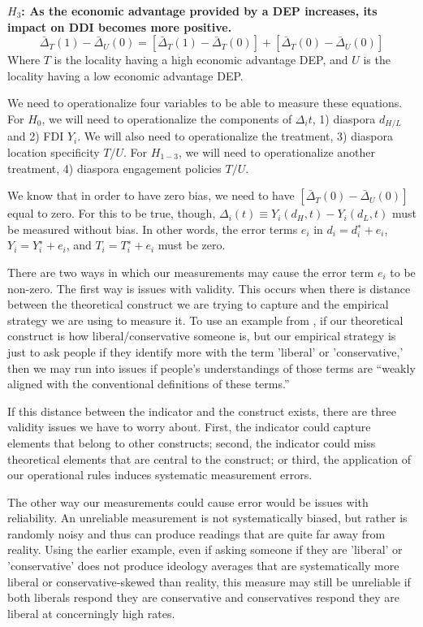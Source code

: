 \documentclass[12pt]{article}
\begin{document}
\textbf{$H_3$:  As the economic advantage provided by a DEP increases, its impact on DDI becomes more positive.}
\[
\bar{\Delta}_T(1)-\bar{\Delta}_U(0)
=
\left[\bar{\Delta}_T(1)-\bar{\Delta}_T(0)\right]
+
\left[\bar{\Delta}_T(0)-\bar{\Delta}_U(0)\right]
\]
Where $T$ is the locality having a high economic advantage DEP, and $U$ is the locality having a low economic advantage DEP.

    We need to operationalize four variables to be able to measure these equations. For $H_0$, we will need to operationalize the components of $\Delta_it$, 1) diaspora $d_{H/L}$ and 2) FDI $Y_i$. We will also need to operationalize the treatment, 3) diaspora location specificity $T/U$. For $H_{1-3}$, we will need to operationalize another treatment, 4) diaspora engagement policies $T/U$.  

     We know that in order to have zero bias, we need to have $\left[\bar{\Delta}_T(0)-\bar{\Delta}_U(0)\right]$ equal to zero. For this to be true, though, $
\Delta_i(t) \equiv Y_i(d_H,t)-Y_i(d_L,t)$ must be measured without bias. In other words, the error terms $e_i$ in $d_i=d_i^∗+e_i$, $Y_i=Y_i^∗+e_i$, and $T_i=T_i^∗+e_i$ must be zero. 

    There are two ways in which our measurements may cause the error term $e_i$ to be non-zero. The first way is issues with validity. This occurs when there is distance between the theoretical construct we are trying to capture and the empirical strategy we are using to measure it. To use an example from \citet{yeung_self-reported_2025}, if our theoretical construct is how liberal/conservative someone is, but our empirical strategy is just to ask people if they identify more with the term 'liberal' or 'conservative,' then we may run into issues if people's understandings of those terms are ``weakly aligned with the conventional definitions of these terms.''
    
    If this distance between the indicator and the construct exists, there are three validity issues we have to worry about. First, the indicator could capture elements that belong to other constructs; second, the indicator could miss theoretical elements that are central to the construct; or third, the application of our operational rules induces systematic measurement errors.

    The other way our measurements could cause error would be issues with reliability. An unreliable measurement is not systematically biased, but rather is randomly noisy and thus can produce readings that are quite far away from reality. Using the earlier example, even if asking someone if they are 'liberal' or 'conservative' does not produce ideology averages that are systematically more liberal or conservative-skewed than reality, this measure may still be unreliable if both liberals respond they are conservative and conservatives respond they are liberal at concerningly high rates. 
\end{document}
